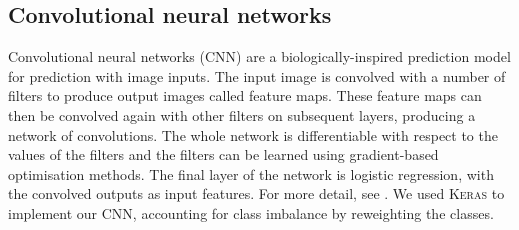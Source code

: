   \subsection{Convolutional neural networks}
  \label{sec:atlas-convolutional-neural-networks}

    Convolutional neural networks (CNN) are a biologically-inspired prediction
    model for prediction with image inputs. The input image is convolved with
    a number of filters to produce output images called feature maps. These
    feature maps can then be convolved again with other filters on subsequent
    layers, producing a network of convolutions. The whole network is
    differentiable with respect to the values of the filters and the filters
    can be learned using gradient-based optimisation methods. The final layer
    of the network is logistic regression, with the convolved outputs as input
    features. For more detail, see \citet[subsection II.A][]{lecun98}. We used
    \textsc{Keras} \citep{chollet15keras} to implement our CNN, accounting for
    class imbalance by reweighting the classes.

